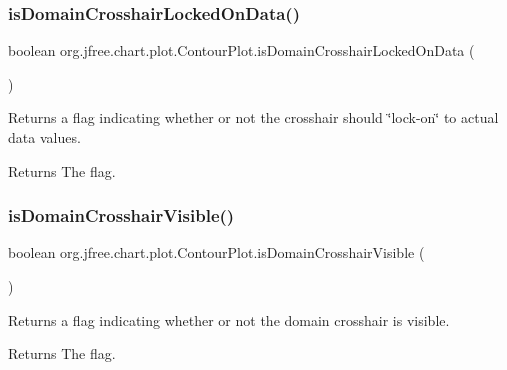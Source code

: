 \subsubsection{\texorpdfstring{is\+Domain\+Crosshair\+Locked\+On\+Data()}{isDomainCrosshairLockedOnData()}}
{\footnotesize\ttfamily boolean org.\+jfree.\+chart.\+plot.\+Contour\+Plot.\+is\+Domain\+Crosshair\+Locked\+On\+Data (\begin{DoxyParamCaption}{ }\end{DoxyParamCaption})}

Returns a flag indicating whether or not the crosshair should \char`\"{}lock-\/on\char`\"{} to actual data values.

\begin{DoxyReturn}{Returns}
The flag. 
\end{DoxyReturn}
\mbox{\label{classorg_1_1jfree_1_1chart_1_1plot_1_1_contour_plot_afd2bb4f42aa1c1b5092f166749fbf7df}} 
\subsubsection{\texorpdfstring{is\+Domain\+Crosshair\+Visible()}{isDomainCrosshairVisible()}}
{\footnotesize\ttfamily boolean org.\+jfree.\+chart.\+plot.\+Contour\+Plot.\+is\+Domain\+Crosshair\+Visible (\begin{DoxyParamCaption}{ }\end{DoxyParamCaption})}

Returns a flag indicating whether or not the domain crosshair is visible.

\begin{DoxyReturn}{Returns}
The flag. 
\end{DoxyReturn}
\mbox{\label{classorg_1_1jfree_1_1chart_1_1plot_1_1_contour_plot_a4e8da768c581b1f0dd0c60f40e76343f}} 
